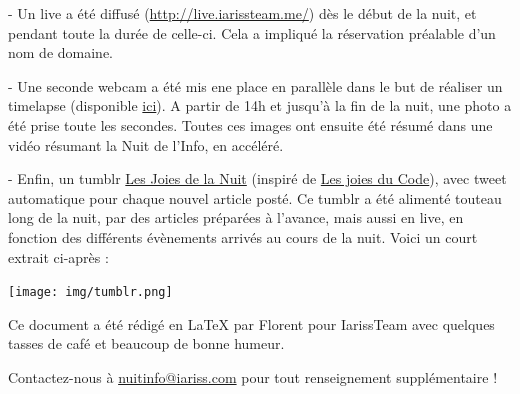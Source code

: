 \documentclass[12pt, a4paper]{article}
\newcommand{\espace}{\vspace{.8cm}}
\newcommand{\authors}{Florent}
\begin{document}
- Un live a été diffusé (\href{http://live.iarissteam.me/}{http://live.iarissteam.me/}) dès le début de la nuit, et pendant toute la durée de celle-ci. Cela a impliqué la réservation préalable d'un nom de domaine.

- Une seconde webcam a été mis ene place en parallèle dans le but de réaliser un timelapse (disponible \href{http://timelapse.iarissteam.me}{ici}). A partir de 14h et jusqu'à la fin de la nuit, une photo a été prise toute les secondes. Toutes ces images ont ensuite été résumé dans une vidéo résumant la Nuit de l'Info, en accéléré.

- Enfin, un tumblr \href{http://lesjoiesdelanuit.tumblr.com/}{Les Joies de la Nuit} (inspiré de \href{http://lesjoiesducode.tumblr.com/}{Les joies du Code}), avec tweet automatique pour chaque nouvel article posté. Ce tumblr a été alimenté touteau long de la nuit, par des articles préparées à l'avance, mais aussi en \og{}live\fg{}, en fonction des différents évènements arrivés au cours de la nuit. Voici un court extrait ci-après : 

\espace{}
\begin{center}
\texttt{[image: img/tumblr.png]}
\end{center}
\espace{}




\espace\vfill{}
Ce document a été rédigé en \LaTeX{} par \authors{} pour IarissTeam avec quelques tasses de café et beaucoup de bonne humeur.

Contactez-nous à \href{mailto:nuitinfo@iariss.com}{nuitinfo@iariss.com} pour tout renseignement supplémentaire !
\end{document}
